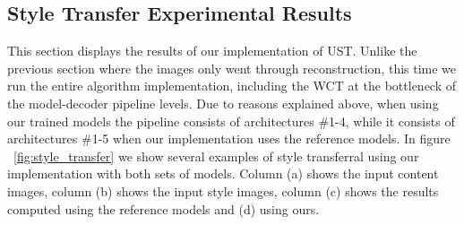 \subsection{Style Transfer Experimental Results}
This section displays the results of our implementation of UST\cite{bib11}. Unlike the previous section where the images only went through reconstruction, this time we run the entire algorithm implementation, including the WCT at the bottleneck of the model-decoder pipeline levels. Due to reasons explained above, when using our trained models the pipeline consists of architectures \#1-4, while it consists of architectures \#1-5 when our implementation uses the reference models. In figure ~\ref{fig:style_transfer} we show several examples of style transferral using our implementation with both sets of models. Column (a) shows the input content images, column (b) shows the input style images, column (c) shows the results computed using the reference models and (d) using ours.\\

